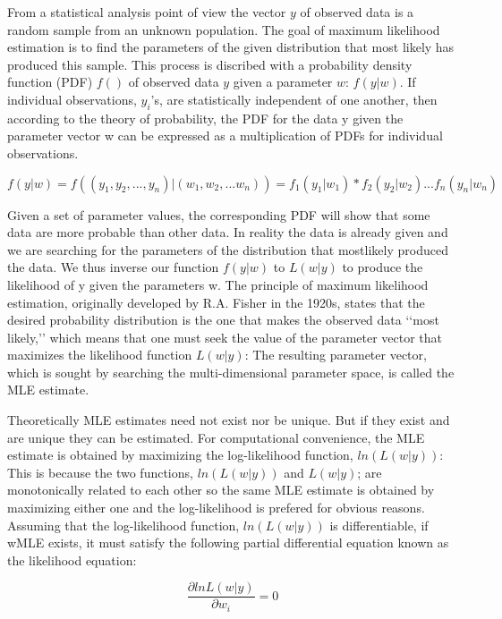 \documentclass{article}
\begin{document}
    From a statistical analysis point of view the vector $y$ of observed data is a random sample from an unknown population. The goal of maximum likelihood estimation is to find the parameters of the given distribution that most likely has produced this sample. This process is discribed with a probability density function (PDF) $f()$ of observed data $y$ given a parameter $w$: $f(y|w)$. If individual observations, $y_i$’s, are statistically independent of one another, then according to the theory of probability, the PDF for the data y given the parameter vector w can be expressed as a multiplication of PDFs for individual observations.

    \begin{equation} f(y|w) = f((y_1, y_2,...,y_n) | (w_1,w_2, ... w_n )) = f_1(y_1|w_1)*f_2(y_2|w_2) ... f_n(y_n|w_n) \end{equation}

    Given a set of parameter values, the corresponding PDF will show that some data are more probable than other data. In reality the data is already given and we are searching for the parameters of the distribution that mostlikely produced the data. We thus inverse our function $f(y|w)$ to $L(w|y)$ to produce the likelihood of y given the parameters w. The principle of maximum likelihood estimation, originally developed by R.A. Fisher in the 1920s, states that the desired probability distribution is the one that makes the observed data ‘‘most likely,’’ which means that one must seek the value of the parameter vector that maximizes the likelihood function $L(w|y)$: The resulting parameter vector, which is sought by searching the multi-dimensional parameter space, is called the MLE estimate.

    Theoretically MLE estimates need not exist nor be unique. But if they exist and are unique they can be estimated. For computational convenience, the MLE estimate is obtained by maximizing the log-likelihood function, $ln(L(w|y))$: This is because the two functions, $ln(L(w|y))$ and $L(w|y)$; are monotonically related to each other so the same MLE estimate is obtained by maximizing either one and the log-likelihood is prefered for obvious reasons. Assuming that the log-likelihood function, $ln(L(w|y))$ is differentiable, if wMLE exists, it must satisfy the following partial differential equation known as the likelihood equation:

    \begin{equation} \frac{\partial ln L(w|y)}{\partial w_i} = 0 \end{equation}
\end{document}
